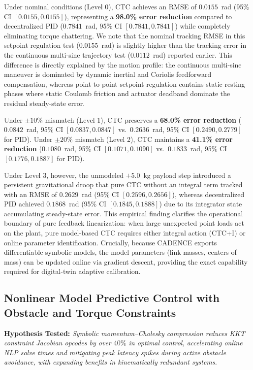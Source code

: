 \documentclass[fleqn,10pt]{article}
\begin{document}
Under nominal conditions (Level 0), CTC achieves an RMSE of $0.0155$~rad (95\% CI $[0.0155, 0.0155]$), representing a \textbf{98.0\% error reduction} compared to decentralized PID ($0.7841$~rad, 95\% CI $[0.7841, 0.7841]$) while completely eliminating torque chattering. We note that the nominal tracking RMSE in this setpoint regulation test ($0.0155$~rad) is slightly higher than the tracking error in the continuous multi-sine trajectory test ($0.0112$~rad) reported earlier. This difference is directly explained by the motion profile: the continuous multi-sine maneuver is dominated by dynamic inertial and Coriolis feedforward compensation, whereas point-to-point setpoint regulation contains static resting phases where static Coulomb friction and actuator deadband dominate the residual steady-state error.

Under $\pm 10\%$ mismatch (Level 1), CTC preserves a \textbf{68.0\% error reduction} ($0.0842$~rad, 95\% CI $[0.0837, 0.0847]$ vs.\ $0.2636$~rad, 95\% CI $[0.2490, 0.2779]$ for PID). Under $\pm 20\%$ mismatch (Level 2), CTC maintains a \textbf{41.1\% error reduction} ($0.1080$~rad, 95\% CI $[0.1071, 0.1090]$ vs.\ $0.1833$~rad, 95\% CI $[0.1776, 0.1887]$ for PID).

Under Level 3, however, the unmodeled $+5.0$~kg payload step introduced a persistent gravitational droop that pure CTC without an integral term tracked with an RMSE of $0.2629$~rad (95\% CI $[0.2596, 0.2656]$), whereas decentralized PID achieved $0.1868$~rad (95\% CI $[0.1845, 0.1888]$) due to its integrator state accumulating steady-state error. This empirical finding clarifies the operational boundary of pure feedback linearization: when large unexpected point loads act on the plant, pure model-based CTC requires either integral action (CTC+I) or online parameter identification. Crucially, because CADENCE exports differentiable symbolic models, the model parameters (link masses, centers of mass) can be updated online via gradient descent, providing the exact capability required for digital-twin adaptive calibration.

\subsection{Nonlinear Model Predictive Control with Obstacle and Torque Constraints}

\noindent\textbf{Hypothesis Tested:} \textit{Symbolic momentum--Cholesky compression reduces KKT constraint Jacobian opcodes by over $40\%$ in optimal control, accelerating online NLP solve times and mitigating peak latency spikes during active obstacle avoidance, with expanding benefits in kinematically redundant systems.}
\end{document}
